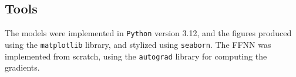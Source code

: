 \subsection{Tools}\label{ssec:tools}
The models were implemented in \verb|Python| version 3.12, and the figures produced using the \verb|matplotlib| library, and stylized using \verb|seaborn|. The FFNN was implemented from scratch, using the \verb|autograd| library \cite{maclaurin2015:autograd} for computing the gradients.